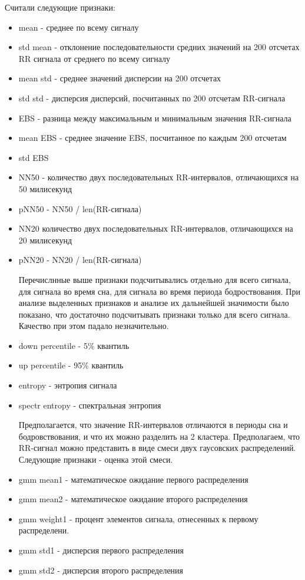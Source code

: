Считали следующие признаки:
\begin{itemize}
	\item mean - среднее по всему сигналу
	\item std mean - отклонение последовательности средних значений на 200 отсчетах RR сигнала от среднего по всему сигналу
	\item mean std - среднее значений дисперсии на 200 отсчетах
	\item std std - дисперсия дисперсий, посчитанных по 200 отсчетам RR-сигнала
	\item EBS - разница между максимальным и минимальным значения RR-сигнала
	\item mean EBS - среднее значение EBS, посчитанное по каждым 200 отсчетам
	\item std EBS
	\item NN50 - количество двух последовательных RR-интервалов, отличающихся на 50 милисекунд
	\item pNN50 - NN50 / len(RR-сигнала)
	\item NN20 количество двух последовательных RR-интервалов, отличающихся на 20 милисекунд
	\item pNN20 - NN20 / len(RR-сигнала)
	
	Перечислнные выше признаки подсчитывались отдельно для всего сигнала, для сигнала во время сна, для сигнала во время периода бодроствования. При анализе выделенных признаков и анализе их дальнейшей значимости было показано, что достаточно подсчитывать признаки только для всего сигнала. Качество при этом падало незначительно.
	
	\item down percentile - 5\% квантиль
	\item up percentile - 95\% квантиль
	\item entropy - энтропия сигнала
	\item spectr entropy - спектральная энтропия
	
	Предполагается, что значение RR-интервалов отличаются в периоды сна и бодровствования, и что их можно разделить на 2 кластера. Предполагаем, что RR-сигнал можно представить в виде смеси двух гаусовских распределений. Следующие признаки - оценка этой смеси. 
	
	\item gmm mean1 - математическое ожидание первого распределения
	\item gmm mean2 - математическое ожидание второго распределения
	\item gmm weight1 - процент элементов сигнала, отнесенных к первому распределени.
	\item gmm std1 - дисперсия первого распределения
	\item gmm std2 - дисперсия второго распределения
	

\end{itemize}
